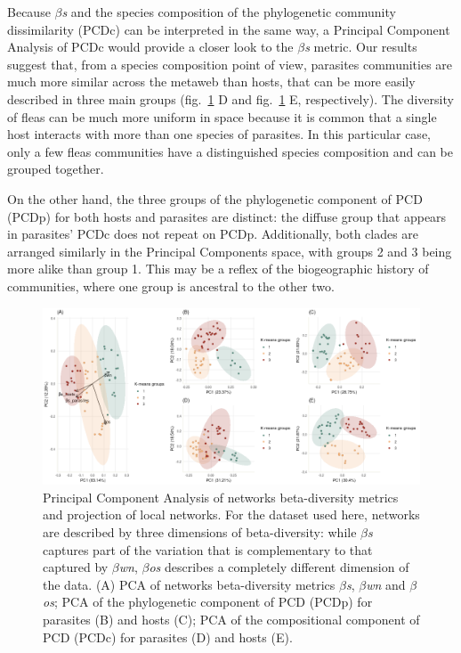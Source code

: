 \documentclass[12pt]{article}
\makeatletter
\def\maxwidth{\ifdim\Gin@nat@width>\linewidth\linewidth
\else\Gin@nat@width\fi}
\let\Oldincludegraphics\includegraphics
\renewcommand{\includegraphics}[1]{\Oldincludegraphics[width=\maxwidth]{#1}}
\makeatother
\begin{document}
Because \emph{\(\beta\)s} and the species composition of the
phylogenetic community dissimilarity (PCDc) can be interpreted in the
same way, a Principal Component Analysis of PCDc would provide a closer
look to the \emph{\(\beta\)s} metric. Our results suggest that, from a
species composition point of view, parasites communities are much more
similar across the metaweb than hosts, that can be more easily described
in three main groups (fig.~\ref{fig:one} D and fig.~\ref{fig:one} E,
respectively). The diversity of fleas can be much more uniform in space
because it is common that a single host interacts with more than one
species of parasites. In this particular case, only a few fleas
communities have a distinguished species composition and can be grouped
together.

On the other hand, the three groups of the phylogenetic component of PCD
(PCDp) for both hosts and parasites are distinct: the diffuse group that
appears in parasites' PCDc does not repeat on PCDp. Additionally, both
clades are arranged similarly in the Principal Components space, with
groups 2 and 3 being more alike than group 1. This may be a reflex of
the biogeographic history of communities, where one group is ancestral
to the other two.

\begin{figure}
\hypertarget{fig:one}{%
\centering
\includegraphics{figures/fig1.png}
\caption{Principal Component Analysis of networks beta-diversity metrics
and projection of local networks. For the dataset used here, networks
are described by three dimensions of beta-diversity: while
\emph{\(\beta\)s} captures part of the variation that is complementary
to that captured by \emph{\(\beta\)wn}, \emph{\(\beta\)os} describes a
completely different dimension of the data. (A) PCA of networks
beta-diversity metrics \emph{\(\beta\)s}, \emph{\(\beta\)wn} and
\emph{\(\beta\)os}; PCA of the phylogenetic component of PCD (PCDp) for
parasites (B) and hosts (C); PCA of the compositional component of PCD
(PCDc) for parasites (D) and hosts (E).}\label{fig:one}
}
\end{figure}
\end{document}
